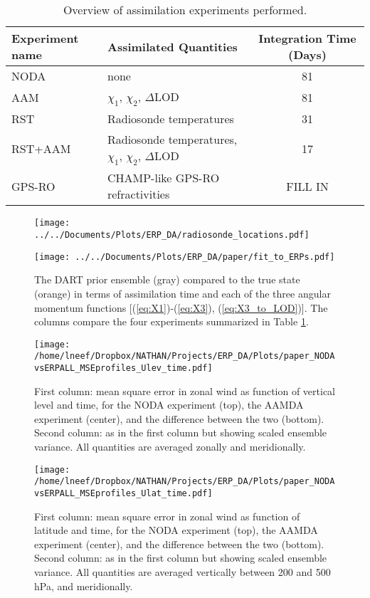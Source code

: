 
\begin{table}
\caption{Overview of assimilation experiments performed.}
\centering
\begin{tabular}{llc}
Experiment name &  Assimilated Quantities  & Integration Time (Days) \\
\hline
NODA  &  none	& 81 				\\
AAM  &  $\chi_1$, $\chi_2$, $\Delta$LOD		& 81\\
RST  &  Radiosonde temperatures	& 31	\\
RST+AAM	 &  Radiosonde temperatures, $\chi_1$, $\chi_2$, $\Delta$LOD	& 17\\
\textcolor{unsure}{GPS-RO}	& \textcolor{unsure}{CHAMP-like GPS-RO refractivities} & \textcolor{alert}{FILL IN}	\\
\hline
\end{tabular}
\label{tab:expts}
\end{table}

 \begin{figure}
\texttt{[image: ../../Documents/Plots/ERP\_DA/radiosonde\_locations.pdf]} 
 \caption{  }
 \label{fig:RS}
\end{figure}

 \begin{figure}
\texttt{[image: ../../Documents/Plots/ERP\_DA/paper/fit\_to\_ERPs.pdf]} 
 \caption{ The DART prior ensemble (gray) compared to the true state (orange) in terms of assimilation time and each of the three angular momentum functions [(\ref{eq:X1})-(\ref{eq:X3}), (\ref{eq:X3_to_LOD})].  The columns compare the four experiments summarized in Table \ref{tab:expts}.  }
 \label{fig:fit_to_ERPs}
\end{figure}

 \begin{figure}
 \texttt{[image: /home/lneef/Dropbox/NATHAN/Projects/ERP\_DA/Plots/paper\_NODAvsERPALL\_MSEprofiles\_Ulev\_time.pdf]}
 \caption{First column: mean square error in zonal wind as function of vertical level and time, for the NODA experiment (top), the AAMDA experiment (center), and the difference between the two (bottom). Second column: as in the first column but showing scaled ensemble variance. All quantities are averaged zonally and meridionally.} 
 \label{fig:MSEprofiles}
\end{figure}

 \begin{figure}
 \texttt{[image: /home/lneef/Dropbox/NATHAN/Projects/ERP\_DA/Plots/paper\_NODAvsERPALL\_MSEprofiles\_Ulat\_time.pdf]}
 \caption{First column: mean square error in zonal wind as function of latitude and time, for the NODA experiment (top), the AAMDA experiment (center), and the difference between the two (bottom). Second column: as in the first column but showing scaled ensemble variance. All quantities are averaged vertically between 200 and 500 hPa, and meridionally.} 
 \label{fig:MSEsurface}
\end{figure}




